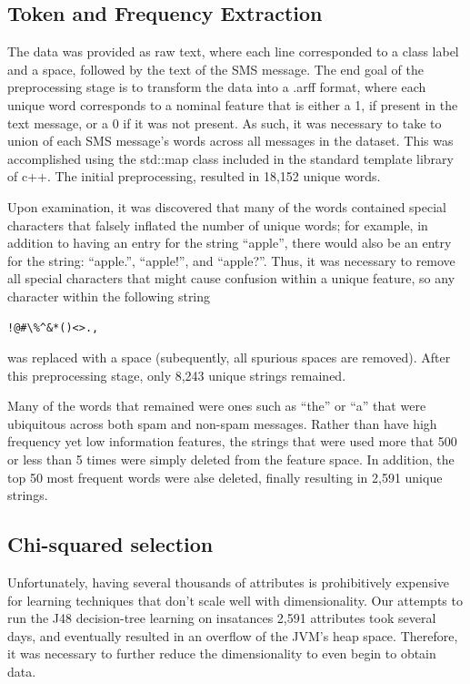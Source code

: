 \documentclass[letterpaper, 10 pt, conference]{ieeeconf}  %
\begin{document}
\subsection{Token and Frequency Extraction}

The data was provided as raw text, where each line corresponded to a
class label and a space, followed by the text of the SMS message. The
end goal of the preprocessing stage is to transform the data into a
.arff format, where each unique word corresponds to a nominal feature
that is either a 1, if present in the text message, or a 0 if it was
not present. As such, it was necessary to take to union of each SMS
message's words across all messages in the dataset. This was
accomplished using the std::map class included in the standard
template library of c++.  The initial preprocessing, resulted in
18,152 unique words.  

Upon examination, it was discovered that many of the words contained
special characters that falsely inflated the number of unique words;
for example, in addition to having an entry for the string ``apple'',
there would also be an entry for the string: ``apple.'', ``apple!'',
and ``apple?''. Thus, it was necessary to remove all special
characters that might cause confusion within a unique feature, so any
character within the following
string \begin{verbatim}!@#\%^&*()<>.,\end{verbatim} was replaced with
a space (subequently, all spurious spaces are removed). After this
preprocessing stage, only 8,243 unique strings remained.

Many of the words that remained were ones such as ``the'' or ``a''
that were ubiquitous across both spam and non-spam messages. Rather
than have high frequency yet low information features, the strings
that were used more that 500 or less than 5 times were simply deleted
from the feature space. In addition, the top 50 most frequent words
were alse deleted, finally resulting in 2,591 unique strings. 

\subsection{Chi-squared selection}

Unfortunately, having several thousands of attributes is prohibitively
expensive for learning techniques that don't scale well with
dimensionality. Our attempts to run the J48 decision-tree learning on
insatances 2,591 attributes took several days, and eventually resulted
in an overflow of the JVM's heap space. Therefore, it was necessary to
further reduce the dimensionality to even begin to obtain data.
\end{document}

